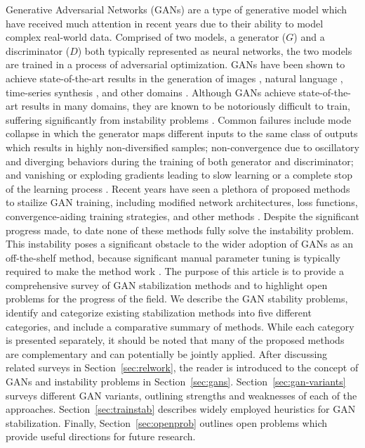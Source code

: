 

\label{sec:intro}
Generative Adversarial Networks (GANs)  are a type of generative model which have received much attention in recent years due to their ability to model complex real-world data. Comprised of two models, a generator ($G$) and a discriminator ($D$) both typically represented as neural networks, the two models are trained in a process of adversarial optimization. GANs have been shown to achieve state-of-the-art results in the generation of images , natural language , time-series synthesis , and other domains .
Although GANs achieve state-of-the-art results in many domains, they are known to be notoriously difficult to train, suffering significantly from instability problems . Common failures include mode collapse in which the generator maps different inputs to the same class of outputs which results in highly non-diversified samples; non-convergence due to oscillatory and diverging behaviors during the training of both generator and discriminator; and vanishing or exploding gradients leading to slow learning or a complete stop of the learning process . 
Recent years have seen a plethora of proposed methods to stailize GAN training, including modified network architectures, loss functions, convergence-aiding training strategies, and other methods . Despite the significant progress made, to date none of these methods fully solve the instability problem. This instability poses a significant obstacle to the wider adoption of GANs as an off-the-shelf method, because significant manual parameter tuning is typically required to make the method work .
The purpose of this article is to provide a comprehensive survey of GAN stabilization methods and to highlight open problems for the progress of the field. We describe the GAN stability problems, identify and categorize existing stabilization methods into five different categories, and include a comparative summary of methods. While each category is presented separately, it should be noted that many of the proposed methods are complementary and can potentially be jointly applied. 
After discussing related surveys in Section~\ref{sec:relwork}, the reader is introduced to the concept of GANs and instability problems in Section~\ref{sec:gans}. Section~\ref{sec:gan-variants} surveys different GAN variants, outlining strengths and weaknesses of each of the approaches. Section~\ref{sec:trainstab} describes widely employed heuristics for GAN stabilization. Finally, Section~\ref{sec:openprob} outlines open problems which provide useful directions for future research.

